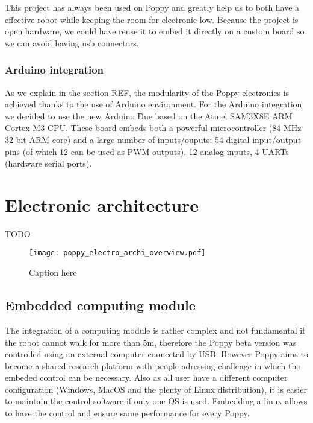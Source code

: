 This project has always been used on Poppy and greatly help us to both have a effective robot while keeping the room for electronic low.
Because the project is open hardware, we could have reuse it to embed it directly on a custom board so we can avoid having usb connectors.

\subsubsection{Arduino integration} %
As we explain in the section REF, the modularity of the Poppy electronics is achieved thanks to the use of Arduino environment. For the Arduino integration we decided to use the new Arduino Due based on the Atmel SAM3X8E ARM Cortex-M3 CPU. These board embeds both a powerful microcontroller (84 MHz 32-bit ARM core) and a large number of inputs/ouputs: 54 digital input/output pins (of which 12 can be used as PWM outputs), 12 analog inputs, 4 UARTs (hardware serial ports).



\section{Electronic architecture} %

TODO

\begin{figure}[tb]
    \begin{center}
        \texttt{[image: poppy\_electro\_archi\_overview.pdf]}
    \end{center}
    \caption{Caption here}
    \label{fig:figure1}
\end{figure}



\subsection{Embedded computing module} %

The integration of a computing module is rather complex and not fundamental if the robot cannot walk for more than 5m, therefore the Poppy beta version was controlled using an external computer connected by USB.
However Poppy aims to become a shared research platform with people adressing challenge in which the embeded control can be necessary. Also as all user have a different computer configuration (Windows, MacOS and the plenty of Linux distribution), it is easier to maintain the control software if only one OS is used. Embedding a linux allows to have the control and ensure same performance for every Poppy.

